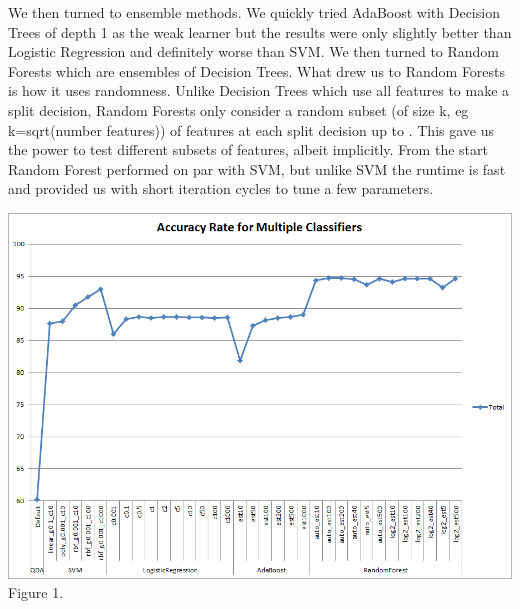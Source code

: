 \documentclass[twoside,11pt]{homework}
\begin{document}
We then turned to ensemble methods. We quickly tried AdaBoost with Decision 
Trees of depth 1 as the weak learner but the results were only slightly better than 
Logistic Regression and definitely worse than SVM. We then turned to Random 
Forests which are ensembles of Decision Trees. What drew us to Random Forests is 
how it uses randomness. Unlike Decision Trees which use all features to make a split 
decision, Random Forests only consider a random subset (of size k, eg 
k=sqrt(number features)) of features at each split decision up to . This gave us the 
power to test different subsets of features, albeit implicitly. From the start Random 
Forest performed on par with SVM, but unlike SVM the runtime is fast and provided 
us with short iteration cycles to tune a few parameters.

\includegraphics[scale=0.5]{classifiers.png}
Figure 1.
\end{document}
